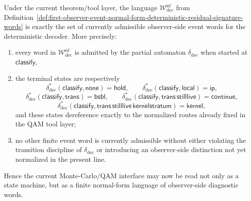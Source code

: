 \begin{proposition}
\label{prop:observer-event-normal-forms-exactly-currently-admissible-decoder-words}
Under the current theorem/tool layer, the language \(\mathcal W^{\mathrm{nf}}_{\mathrm{dec}}\) from Definition~\ref{def:first-observer-event-normal-form-deterministic-residual-signature-words} is exactly the set of currently admissible observer-side event words for the deterministic decoder. More precisely:
\begin{enumerate}[label=(\roman*)]
    \item every word in \(\mathcal W^{\mathrm{nf}}_{\mathrm{dec}}\) is admitted by the partial automaton \(\delta_{\mathrm{dec}}\) when started at \(\mathsf{classify}\),
    \item the terminal states are respectively
    \[
    \delta^{\ast}_{\mathrm{dec}}(\mathsf{classify},\mathsf{none})=\mathsf{hold},\qquad
    \delta^{\ast}_{\mathrm{dec}}(\mathsf{classify},\mathsf{local})=\mathsf{ip},
    \]
    \[
    \delta^{\ast}_{\mathrm{dec}}(\mathsf{classify},\mathsf{trans})=\mathsf{bsbl},\qquad
    \delta^{\ast}_{\mathrm{dec}}(\mathsf{classify},\mathsf{trans}\,\mathsf{stilllive})=\mathsf{continue},
    \]
    \[
    \delta^{\ast}_{\mathrm{dec}}(\mathsf{classify},\mathsf{trans}\,\mathsf{stilllive}\,\mathsf{kernelstratum})=\mathsf{kernel},
    \]
    and these states dereference exactly to the normalized routes already fixed in the QAM tool layer;
    \item no other finite event word is currently admissible without either violating the transition discipline of \(\delta_{\mathrm{dec}}\) or introducing an observer-side distinction not yet normalized in the present line.
\end{enumerate}
Hence the current Monte-Carlo/QAM interface may now be read not only as a state machine, but as a finite normal-form language of observer-side diagnostic words.
\end{proposition}

